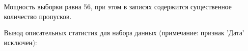 Мощность выборки равна 56, при этом в записях содержится существенное количество пропусков.


Вывод описательных статистик для набора данных (примечание: признак 'Дата' исключен):\\
